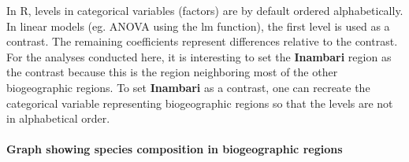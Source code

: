 \documentclass[]{article}
\newenvironment{Shaded}{\begin{snugshade}}{\end{snugshade}}
\newcommand{\CommentTok}[1]{\textcolor[rgb]{0.56,0.35,0.01}{\textit{#1}}}
\newcommand{\DataTypeTok}[1]{\textcolor[rgb]{0.13,0.29,0.53}{#1}}
\newcommand{\KeywordTok}[1]{\textcolor[rgb]{0.13,0.29,0.53}{\textbf{#1}}}
\newcommand{\NormalTok}[1]{#1}
\newcommand{\OperatorTok}[1]{\textcolor[rgb]{0.81,0.36,0.00}{\textbf{#1}}}
\newcommand{\StringTok}[1]{\textcolor[rgb]{0.31,0.60,0.02}{#1}}
\let\oldparagraph\paragraph
\renewcommand{\paragraph}[1]{\oldparagraph{#1}\mbox{}}
\begin{document}
In R, levels in categorical variables (factors) are by default ordered
alphabetically. In linear models (eg. ANOVA using the lm function), the
first level is used as a contrast. The remaining coefficients represent
differences relative to the contrast. For the analyses conducted here,
it is interesting to set the \textbf{Inambari} region as the contrast
because this is the region neighboring most of the other biogeographic
regions. To set \textbf{Inambari} as a contrast, one can recreate the
categorical variable representing biogeographic regions so that the
levels are not in alphabetical order.

\begin{Shaded}
\end{Shaded}

\hypertarget{graph-showing-species-composition-in-biogeographic-regions}{%
\paragraph{Graph showing species composition in biogeographic
regions}\label{graph-showing-species-composition-in-biogeographic-regions}}
\end{document}
